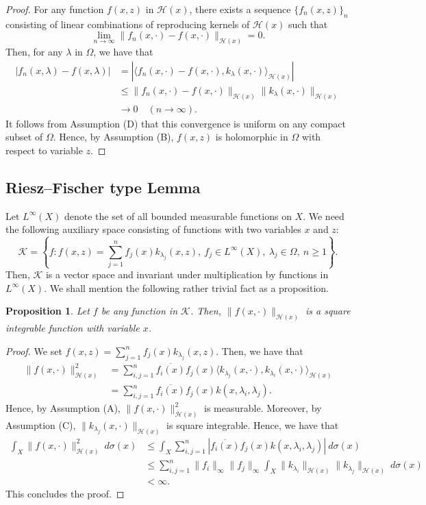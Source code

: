 \documentclass[12pt]{article}
\newtheorem{prop}[thm]{Proposition}
\numberwithin{equation}{section}
\newcommand{\cH}{{\mathcal H}}
\newcommand{\cK}{{\mathcal K}}
\newcommand{\la}{\langle}
\newcommand{\ra}{\rangle}
\newcommand{\lam}{\lambda}
\begin{document}
\begin{proof}
For any function $f(x,z)$ in $\cH(x)$, 
there exists a sequence $\{f_n(x,z)\}_n$ consisting of linear combinations of reproducing kernels of $\cH(x)$ 
such that 
\[
\lim_{n\to \infty}\|f_n(x,\cdot)-f(x,\cdot)\|_{\cH(x)}=0.
\]
Then, for any $\lam$ in $\Omega$, we have that 
\begin{align*}
|f_n(x,\lam)-f(x,\lam)|
&=|\la f_n(x,\cdot)-f(x,\cdot),k_{\lam}(x,\cdot) \ra_{\cH(x)}|\\
&\leq \|f_n(x,\cdot)-f(x,\cdot)\|_{\cH(x)}\|k_{\lam}(x,\cdot)\|_{\cH(x)}\\
&\to 0\quad(n\to \infty).
\end{align*}
It follows from Assumption (D) that  
this convergence is uniform on any compact subset of $\Omega$.   
Hence, by Assumption (B), $f(x,z)$ is holomorphic in $\Omega$ with respect to variable $z$. 
\end{proof}


\subsection{Riesz--Fischer type Lemma}
Let $L^{\infty}(X)$ denote the set of all bounded measurable functions on $X$. 
We need the following auxiliary space consisting of functions with two variables $x$ and $z$: 
\[
\cK=\left\{f:f(x,z)=\sum_{j=1}^nf_j(x)k_{\lam_j}(x,z),\ f_j\in L^{\infty}(X),\ \lam_j\in \Omega,\ n\geq 1\right\}.
\]
Then, $\cK$ is a vector space and invariant under multiplication by functions in $L^{\infty}(X)$. 
We shall mention the following rather trivial fact as a proposition. 
\begin{prop}
Let $f$ be any function in $\cK$. 
Then, $\|f(x,\cdot)\|_{\cH(x)}$ is a square integrable function with variable $x$. 
\end{prop}

\begin{proof}
We set $f(x,z)=\sum_{j=1}^nf_j(x)k_{\lam_j}(x,z)$. 
Then, we have that 
\begin{align*}
\|f(x,\cdot)\|_{\cH(x)}^2&=\sum_{i,j=1}^n\overline{f_i(x)}f_j(x)\la k_{\lam_j}(x,\cdot),k_{\lam_i}(x,\cdot) \ra_{\cH(x)}\\
&=\sum_{i,j=1}^n\overline{f_i(x)}f_j(x)k(x,\lam_i,\lam_j). 
\end{align*}
Hence, by Assumption (A), $\|f(x,\cdot)\|_{\cH(x)}^2$ is measurable.  
Moreover, by Assumption (C), $\|k_{\lam_j}(x,\cdot)\|_{\cH(x)}$ is square integrable. 
Hence, we have that 
\begin{align*}
\int_X \|f(x,\cdot)\|_{\cH(x)}^2\ d\sigma(x)
&\leq \int_X\sum_{i,j=1}^n\left|\overline{f_i(x)}f_j(x)k(x,\lam_i,\lam_j)\right|\ d\sigma(x)\\
&\leq \sum_{i,j=1}^n\|f_i\|_{\infty}\|f_j\|_{\infty}\int_X\|k_{\lam_i}\|_{\cH(x)}\|k_{\lam_j}\|_{\cH(x)}\ d\sigma(x)\\
&<\infty.
\end{align*}
This concludes the proof.
\end{proof}
\end{document}
